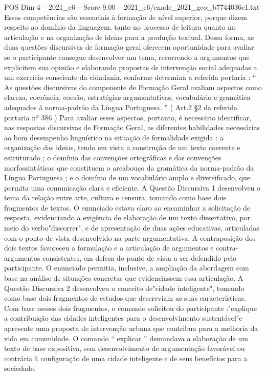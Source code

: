 \begin{textsample}{POS Dim 4 – 2021\_c6 – Score 9.00 – 2021\_c6/enade\_2021\_geo\_b7744036e1.txt}
Essas competências são essenciais à formação de nível superior, porque dizem respeito ao domínio da linguagem, tanto no processo de leitura quanto na articulação e na organização de ideias para a produção textual.
Dessa forma, as duas questões discursivas de formação geral oferecem oportunidade para avaliar se o participante consegue desenvolver um tema, recorrendo a argumentos que explicitem sua opinião e elaborando propostas de intervenção social adequadas a um exercício consciente da cidadania, conforme determina a referida portaria : “ As questões discursivas do componente de Formação Geral avaliam aspectos como clareza, coerência, coesão, estratégias argumentativas, vocabulário e gramática adequados à norma-padrão da Língua Portuguesa. ” ( Art.2 §2 da referida portaria nº 386 ) Para avaliar esses aspectos, portanto, é necessário identificar, nas respostas discursivas de Formação Geral, as diferentes habilidades necessárias ao bom desempenho linguístico na situação de formalidade exigida : a organização das ideias, tendo em vista a construção de um texto coerente e estruturado ; o domínio das convenções ortográficas e das convenções morfossintáticas que constituem o arcabouço da gramática da norma-padrão da Língua Portuguesa ; e o domínio de um vocabulário amplo e diversificado, que permita uma comunicação clara e eficiente.
A Questão Discursiva 1 desenvolveu o tema da relação entre arte, cultura e censura, tomando como base dois fragmentos de textos.
O enunciado estava claro ao encaminhar a solicitação de resposta, evidenciando a exigência de elaboração de um texto dissertativo, por meio do verbo"discorrer", e de apresentação de duas ações educativas, articuladas com o ponto de vista desenvolvido na parte argumentativa.
A contraposição dos dois textos favoreceu a formulação e a articulação de argumentos e contra-argumentos consistentes, em defesa do ponto de vista a ser defendido pelo participante.
O enunciado permitia, inclusive, a ampliação da abordagem com base na análise de situações concretas que evidenciassem essa articulação.
A Questão Discursiva 2 desenvolveu o conceito de"cidade inteligente", tomando como base dois fragmentos de estudos que descreviam as suas características.
Com base nesses dois fragmentos, o comando solicitou do participante :"explique a contribuição das cidades inteligentes para o desenvolvimento sustentável"e apresente uma proposta de intervenção urbana que contribua para a melhoria da vida em comunidade.
O comando “ explicar ” demandava a elaboração de um texto de base expositiva, sem desenvolvimento de argumentação favorável ou contrária à configuração de uma cidade inteligente e de seus benefícios para a sociedade.

\end{textsample}
